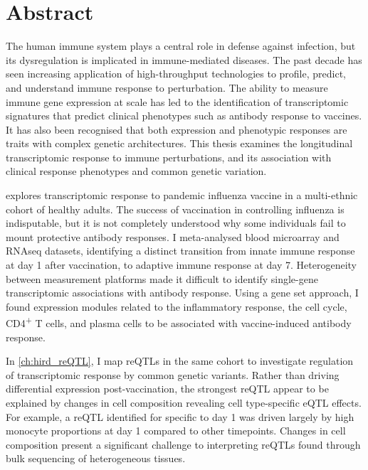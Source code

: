 %
%
\chapter*{Abstract}


The human immune system plays a central role in defense against infection, 
but its dysregulation is implicated in immune-mediated diseases.
The past decade has seen increasing application of high-throughput technologies to profile, predict, and understand immune response to perturbation.
The ability to measure immune gene expression at scale has led to the identification of 
transcriptomic signatures that predict clinical phenotypes such as antibody response to vaccines.
It has also been recognised that both expression and phenotypic responses are traits with complex genetic architectures.
This thesis examines the longitudinal transcriptomic response to immune perturbations,
and its association with clinical response phenotypes and common genetic variation.

 explores transcriptomic response to pandemic influenza vaccine in a multi-ethnic cohort of healthy adults.
The success of vaccination in controlling influenza is indisputable, 
but it is not completely understood why some individuals fail to mount protective antibody responses.
I meta-analysed blood microarray and \gls{RNAseq} datasets, 
identifying a distinct transition from innate immune response at day 1 after vaccination, to adaptive immune response at day 7.
Heterogeneity between measurement platforms made it difficult to identify single-gene transcriptomic associations with antibody response.
Using a gene set approach, I found expression modules related to the inflammatory response, the cell cycle, CD4\textsuperscript{+} T cells, and plasma cells 
to be associated with vaccine-induced antibody response.

In \cref{ch:hird_reQTL}, I map \glspl{reQTL} in the same cohort to investigate regulation of transcriptomic response by common genetic variants.
Rather than driving differential expression post-vaccination,
the strongest \gls{reQTL} appear to be explained by changes in cell composition revealing cell type-specific \gls{eQTL} effects.
For example, a \gls{reQTL} identified for  specific to day 1 was driven largely by high monocyte proportions at day 1 compared to other timepoints.
Changes in cell composition present a significant challenge to interpreting \glspl{reQTL} found through bulk sequencing of heterogeneous tissues.

